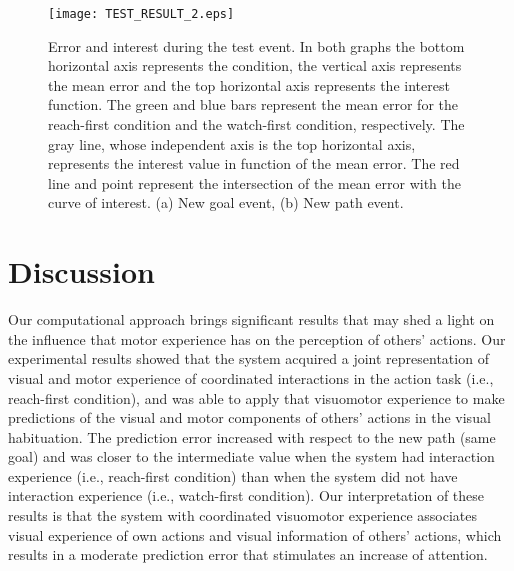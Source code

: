 \documentclass[conference]{IEEEtran}
\begin{document}
\begin{figure}
\centering
\texttt{[image: TEST\_RESULT\_2.eps]}
\caption{Error and interest during the test event. In both graphs the bottom horizontal axis represents the condition, the vertical axis represents the mean error and the top horizontal axis represents the interest function. The green and blue bars represent the mean error for the reach-first condition and the watch-first condition, respectively. The gray line, whose independent axis is the top horizontal axis, represents the interest value in function of the mean error. The red line and point represent the intersection of the mean error with the curve of interest. (a) New goal event, (b) New path event.}
\label{figure7}
\end{figure}

\section{Discussion}
Our computational approach brings significant results that may shed a light on the influence that motor experience has on the perception of others' actions. Our experimental results showed that the system acquired a joint representation of visual and motor experience of coordinated interactions  in the action task (i.e., reach-first condition), and was able to apply that visuomotor experience to make predictions of the visual and motor components of others' actions in the visual habituation. The prediction error increased with respect to the new path (same goal) and was closer to the intermediate value when the system had interaction experience (i.e., reach-first condition) than when the system did not have interaction experience (i.e., watch-first condition). Our interpretation of these results is that the system with coordinated visuomotor experience associates visual experience of own actions and visual information of others' actions, which results in a moderate prediction error that stimulates an increase of attention.
\end{document}
